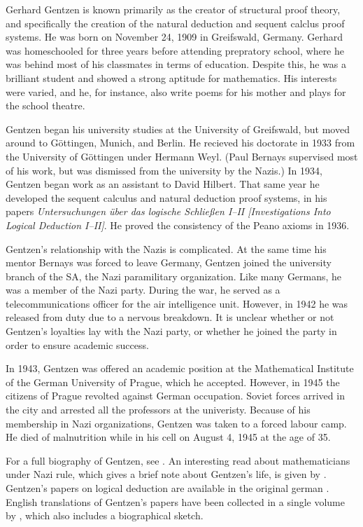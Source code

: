 \documentclass[../../../include/open-logic-section]{subfiles}
\begin{document}



Gerhard Gentzen is known primarily as the creator of structural proof
theory, and specifically the creation of the natural deduction and
sequent calclus proof systems. He was born on November 24, 1909 in
Greifswald, Germany. Gerhard was homeschooled for three years before
attending prepratory school, where he was behind most of his
classmates in terms of education. Despite this, he was a brilliant
student and showed a strong aptitude for mathematics. His interests
were varied, and he, for instance, also write poems for his mother and plays
for the school theatre.

Gentzen began his university studies at the University of Greifswald,
but moved around to G\"{o}ttingen, Munich, and Berlin. He recieved his
doctorate in 1933 from the University of G\"{o}ttingen under Hermann
Weyl.  (Paul Bernays supervised most of his work, but was dismissed
from the university by the Nazis.)  In 1934, Gentzen began work as an
assistant to David Hilbert. That same year he developed the sequent
calculus and natural deduction proof systems, in his papers
\emph{Untersuchungen \"{u}ber das logische Schlie\ss en I--II
  [Investigations Into Logical Deduction I--II]}. He proved the
consistency of the Peano axioms in 1936.

Gentzen's relationship with the Nazis is complicated.  At the same
time his mentor Bernays was forced to leave Germany, Gentzen joined
the university branch of the SA, the Nazi paramilitary
organization. Like many Germans, he was a member of the Nazi
party. During the war, he served as a telecommunications officer for
the air intelligence unit. However, in 1942 he was released from duty
due to a nervous breakdown. It is unclear whether or not Gentzen's
loyalties lay with the Nazi party, or whether he joined the party in
order to ensure academic success.

In 1943, Gentzen was offered an academic position at the Mathematical
Institute of the German University of Prague, which he
accepted. However, in 1945 the citizens of Prague revolted against
German occupation. Soviet forces arrived in the city and arrested all
the professors at the univeristy.  Because of his membership in Nazi
organizations, Gentzen was taken to a forced labour camp. He died of
malnutrition while in his cell on August 4, 1945 at the age of 35.

\begin{reading}
For a full biography of Gentzen, see \citet{Menzler-Trott2007}.  An
interesting read about mathematicians under Nazi rule, which gives a
brief note about Gentzen's life, is given by \citet{Segal2014}.
Gentzen's papers on logical deduction are available in the original
german \citep{Gentzen1935a,Gentzen1935b}.  English translations of
Gentzen's papers have been collected in a single volume by
\citet{Gentzen1969}, which also includes a biographical sketch.
\end{reading}
\end{document}
